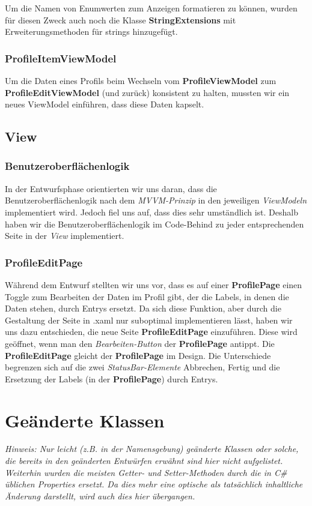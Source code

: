 \documentclass[a4paper]{scrreprt}
\begin{document}
Um die Namen von Enumwerten zum Anzeigen formatieren zu können, wurden für diesen Zweck auch noch die Klasse \textbf{StringExtensions} mit Erweiterungsmethoden für strings hinzugefügt.

\subsubsection{ProfileItemViewModel}
Um die Daten eines Profils beim Wechseln vom \textbf{ProfileViewModel} zum \textbf{ProfileEditViewModel} (und zurück) konsistent zu halten, mussten wir ein neues ViewModel einführen, dass diese Daten kapselt.

\subsection{View}
\subsubsection{Benutzeroberflächenlogik}
In der Entwurfsphase orientierten wir uns daran, dass die Benutzeroberflächenlogik nach dem \textit{MVVM-Prinzip} in den jeweiligen \textit{ViewModeln} implementiert wird. Jedoch fiel uns auf, dass dies sehr umständlich ist. Deshalb haben wir die Benutzeroberflächenlogik im Code-Behind zu jeder entsprechenden Seite in der \textit{View} implementiert.
\subsubsection{ProfileEditPage}
Während dem Entwurf stellten wir uns vor, dass es auf einer \textbf{ProfilePage} einen Toggle zum Bearbeiten der Daten im Profil gibt, der die Labels, in denen die Daten stehen, durch Entrys ersetzt. Da sich diese Funktion, aber durch die Gestaltung der Seite in .xaml nur suboptimal implementieren lässt, haben wir uns dazu entschieden, die neue Seite \textbf{ProfileEditPage} einzuführen. Diese wird geöffnet, wenn man den \textit{Bearbeiten-Button
} der \textbf{ProfilePage} antippt. Die \textbf{ProfileEditPage} gleicht der \textbf{ProfilePage} im Design. Die Unterschiede begrenzen sich auf die zwei \textit{StatusBar-Elemente} \dq{}Abbrechen\dq{}, \dq{}Fertig\dq{} und die Ersetzung der Labels (in der \textbf{ProfilePage}) durch Entrys.

\section{Geänderte Klassen}
\textit{Hinweis: Nur leicht (z.B. in der Namensgebung) geänderte Klassen oder solche, die bereits in den geänderten Entwürfen erwähnt sind hier nicht aufgelistet. Weiterhin wurden die meisten Getter- und Setter-Methoden durch die in C\# üblichen Properties ersetzt. Da dies mehr eine optische als tatsächlich inhaltliche Änderung darstellt, wird auch dies hier übergangen.}
\end{document}
